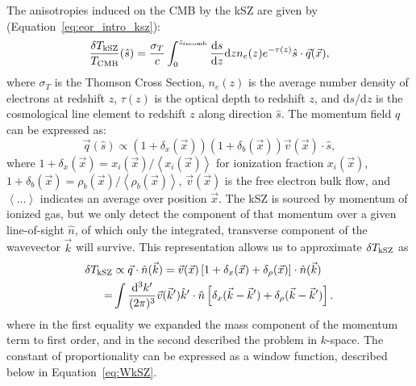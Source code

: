 The anisotropies induced on the CMB by the kSZ are given by (Equation~\ref{eq:eor_intro_ksz}):
\begin{equation}
\frac{\delta T_{\rm kSZ}}{T_{\rm CMB}}(\hat{s}) = \frac{\sigma_T}{c} \int_0^{z_{\rm recomb}} \frac{{\rm d}s}{{\rm d}z}{\rm d}z  n_e(z)e^{-\tau(z)} \hat{s}\cdot\vec{q}(\vec{x}),
\end{equation}
where $\sigma_T$ is the Thomson Cross Section, $n_e(z)$ is the average number density of electrons at redshift $z$, $\tau(z)$ is the optical depth to redshift $z$, and d$s$/d$z$ is the cosmological line element to redshift $z$ along direction $\hat{s}$. 
The momentum field $q$ can be expressed as:
\begin{equation}
\vec{q}(\hat{s}) \propto (1+\delta_x(\vec{x}))(1+\delta_b(\vec{x}))\vec{v}(\vec{x}) \cdot \hat{s},
\end{equation}
where  $1+\delta_x(\vec{x}) = x_i(\vec{x})/\left\langle x_i(\vec{x}) \right\rangle$ for ionization fraction $x_i(\vec{x})$, $1+\delta_b(\vec{x}) = \rho_b(\vec{x})/\left\langle \rho_b(\vec{x}) \right\rangle$, $\vec{v}(\vec{x})$ is the free electron bulk flow, and $\left\langle ... \right\rangle$ indicates an average over position $\vec{x}$. 
The kSZ is sourced by momentum of ionized gas, but we only detect the component of that momentum over a given line-of-sight $\hat{n}$, of which only the integrated, transverse component of the wavevector $\vec{k}$ will survive.
This representation allows us to approximate $\delta T_{\rm kSZ}$ as
\begin{align}
\delta T_{\rm kSZ} &\propto \vec{q}\cdot\hat{n}(\vec{k}) = \vec{v}(\vec{x})\left[1 + \delta_x(\vec{x}) + \delta_{\rho}(\vec{x})\right]\cdot\hat{n}(\vec{k})\\
= & \int \frac{{\rm d}^3k'}{(2\pi)^3}\vec{v}(\vec{k}')\hat{k}'\cdot\hat{n}\left[\delta_x(\vec{k}-\vec{k}') + \delta_{\rho}(\vec{k}-\vec{k}')\right].
\end{align}
where in the first equality we expanded the mass component of the momentum term to first order, and in the second described the problem in $k$-space.
The constant of proportionality can be expressed as a window function, described below in Equation~\ref{eq:WkSZ}. 


